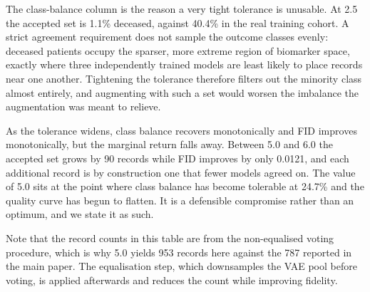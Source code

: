 \documentclass[journal,onecolumn]{IEEEtran}
\begin{document}
\begin{table}[!t]
  \centering
  \caption{Consensus Tolerance Sweep. Composition Percentages Are Shares of the Accepted Set. The Real Training Cohort Is 40.4\% Deceased}
  \label{tab:threshold}
\end{table}

The class-balance column is the reason a very tight tolerance is unusable. At 2.5 the accepted set is 1.1\% deceased, against 40.4\% in the real training cohort. A strict agreement requirement does not sample the outcome classes evenly: deceased patients occupy the sparser, more extreme region of biomarker space, exactly where three independently trained models are least likely to place records near one another. Tightening the tolerance therefore filters out the minority class almost entirely, and augmenting with such a set would worsen the imbalance the augmentation was meant to relieve.

As the tolerance widens, class balance recovers monotonically and FID improves monotonically, but the marginal return falls away. Between 5.0 and 6.0 the accepted set grows by 90 records while FID improves by only 0.0121, and each additional record is by construction one that fewer models agreed on. The value of 5.0 sits at the point where class balance has become tolerable at 24.7\% and the quality curve has begun to flatten. It is a defensible compromise rather than an optimum, and we state it as such.

Note that the record counts in this table are from the non-equalised voting procedure, which is why 5.0 yields 953 records here against the 787 reported in the main paper. The equalisation step, which downsamples the VAE pool before voting, is applied afterwards and reduces the count while improving fidelity.
\end{document}
